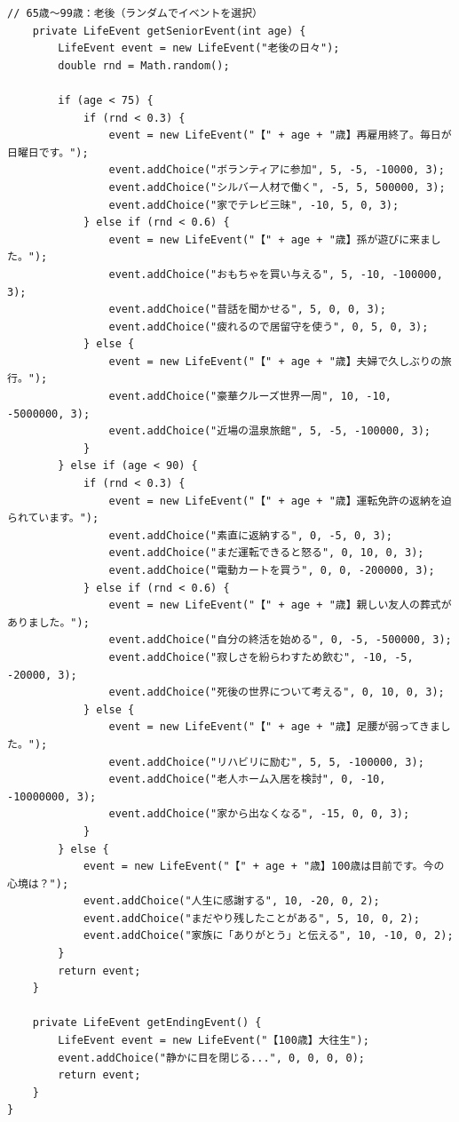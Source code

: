 \documentclass[a4paper,11pt]{jsarticle}
\begin{document}
\begin{lstlisting}[caption=GameLogic.java]
    // 65歳〜99歳：老後（ランダムでイベントを選択）
    private LifeEvent getSeniorEvent(int age) {
        LifeEvent event = new LifeEvent("老後の日々");
        double rnd = Math.random();

        if (age < 75) {
            if (rnd < 0.3) {
                event = new LifeEvent("【" + age + "歳】再雇用終了。毎日が日曜日です。");
                event.addChoice("ボランティアに参加", 5, -5, -10000, 3);
                event.addChoice("シルバー人材で働く", -5, 5, 500000, 3);
                event.addChoice("家でテレビ三昧", -10, 5, 0, 3);
            } else if (rnd < 0.6) {
                event = new LifeEvent("【" + age + "歳】孫が遊びに来ました。");
                event.addChoice("おもちゃを買い与える", 5, -10, -100000, 3);
                event.addChoice("昔話を聞かせる", 5, 0, 0, 3);
                event.addChoice("疲れるので居留守を使う", 0, 5, 0, 3);
            } else {
                event = new LifeEvent("【" + age + "歳】夫婦で久しぶりの旅行。");
                event.addChoice("豪華クルーズ世界一周", 10, -10, -5000000, 3);
                event.addChoice("近場の温泉旅館", 5, -5, -100000, 3);
            }
        } else if (age < 90) {
            if (rnd < 0.3) {
                event = new LifeEvent("【" + age + "歳】運転免許の返納を迫られています。");
                event.addChoice("素直に返納する", 0, -5, 0, 3);
                event.addChoice("まだ運転できると怒る", 0, 10, 0, 3);
                event.addChoice("電動カートを買う", 0, 0, -200000, 3);
            } else if (rnd < 0.6) {
                event = new LifeEvent("【" + age + "歳】親しい友人の葬式がありました。");
                event.addChoice("自分の終活を始める", 0, -5, -500000, 3);
                event.addChoice("寂しさを紛らわすため飲む", -10, -5, -20000, 3);
                event.addChoice("死後の世界について考える", 0, 10, 0, 3);
            } else {
                event = new LifeEvent("【" + age + "歳】足腰が弱ってきました。");
                event.addChoice("リハビリに励む", 5, 5, -100000, 3);
                event.addChoice("老人ホーム入居を検討", 0, -10, -10000000, 3);
                event.addChoice("家から出なくなる", -15, 0, 0, 3);
            }
        } else {
            event = new LifeEvent("【" + age + "歳】100歳は目前です。今の心境は？");
            event.addChoice("人生に感謝する", 10, -20, 0, 2);
            event.addChoice("まだやり残したことがある", 5, 10, 0, 2);
            event.addChoice("家族に「ありがとう」と伝える", 10, -10, 0, 2);
        }
        return event;
    }

    private LifeEvent getEndingEvent() {
        LifeEvent event = new LifeEvent("【100歳】大往生");
        event.addChoice("静かに目を閉じる...", 0, 0, 0, 0);
        return event;
    }
}
\end{lstlisting}
\end{document}
